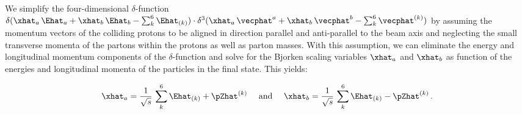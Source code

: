 We simplify the four-dimensional $\delta$-function 
$\delta( \xhat_{a} \, \Ehat_{a} + \xhat_{b} \, \Ehat_{b} - \sum_{k}^{6} \Ehat_{(k)}) \cdot \delta^{3}( \xhat_{a} \, \vecphat^{a} + \xhat_{b} \, \vecphat^{b} - \sum_{k}^{6} \vecphat^{(k)})$
by assuming the momentum vectors of the colliding protons to be aligned in direction parallel and anti-parallel to the beam axis 
and neglecting the small transverse momenta of the partons within the protons as well as parton masses.
With this assumption, we can eliminate the energy and longitudinal momentum components of the $\delta$-function 
and solve for the Bjorken scaling variables $\xhat_{a}$ and $\xhat_{b}$ as function of the energies and longitudinal momenta of the particles in the final state.
This yields:
\begin{linenowrapper}
\begin{equation}
\xhat_{a} = \frac{1}{\sqrt{s}} \, \sum_{k}^{6} \Ehat_{(k)} + \pZhat^{(k)} \quad \mbox{ and } \quad
\xhat_{b} = \frac{1}{\sqrt{s}} \, \sum_{k}^{6} \Ehat_{(k)} - \pZhat^{(k)} \, .
\label{eq:Bjorkenx}
\end{equation}
\end{linenowrapper}

